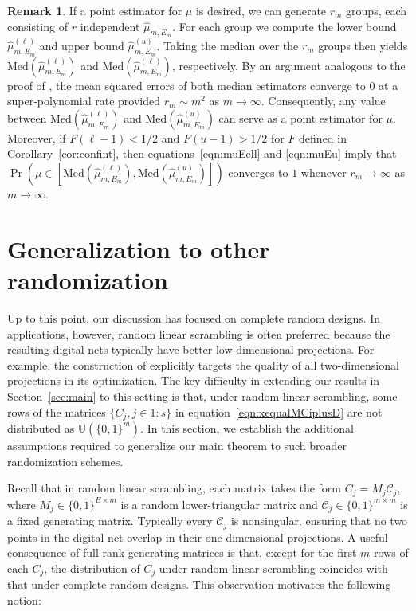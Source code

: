 \documentclass{article}
\theoremstyle{definition}
\newtheorem{remark}{Remark}
\newcommand{\dunif}{\mathbb{U}}
\begin{document}
    \begin{remark}
        If a point estimator for $\mu$ is desired, we can generate $r_m$ groups, each consisting of $r$ independent $\hat{\mu}_{m,E_m}$. For each group we compute the lower bound $\hat{\mu}^{(\ell)}_{m,E_m}$ and upper bound $\hat{\mu}^{(u)}_{m,E_m}$. Taking the median over the $r_m$ groups then yields $\mathrm{Med}(\hat{\mu}^{(\ell)}_{m,E_m})$ and $\mathrm{Med}(\hat{\mu}^{(\ell)}_{m,E_m})$, respectively. By an argument analogous to the proof of \cite[Corollary 3]{superpolymulti}, the mean squared errors of both median estimators converge to $0$ at a super‑polynomial rate provided $r_m\sim m^2$ as $m\to\infty$. Consequently, any value between  $\mathrm{Med}(\hat{\mu}^{(\ell)}_{m,E_m})$ and  $\mathrm{Med}(\hat{\mu}^{(u)}_{m,E_m})$ can serve as a point estimator for $\mu$.  Moreover, if $F(\ell-1)<1/2$ and $F(u-1)>1/2$ for $F$ defined in Corollary~\ref{cor:confint},  then equations~\eqref{eqn:muEell} and \eqref{eqn:muEu} imply that $\Pr(\mu\in [\mathrm{Med}(\hat{\mu}^{(\ell)}_{m,E_m}),\mathrm{Med}(\hat{\mu}^{(u)}_{m,E_m})] )$ converges to $1$ whenever $r_m\to\infty$ as $m\to\infty$.       
    \end{remark}

\section{Generalization to other randomization}\label{sec:general}

Up to this point, our discussion has focused on complete random designs. In applications, however, random linear scrambling is often preferred because the resulting digital nets typically have better low-dimensional projections. For example, the construction of \cite{joe:kuo:2008} explicitly targets the quality of all two-dimensional projections in its optimization. The key difficulty in extending our results in Section~\ref{sec:main} to this setting is that, under random linear scrambling, some rows of the matrices $\{C_j, j\in 1{:}s\}$ in equation~\eqref{eqn:xequalMCiplusD} are not distributed as $\dunif(\{0,1\}^m)$. In this section, we establish the additional assumptions required to generalize our main theorem to such broader randomization schemes.

Recall that in random linear scrambling, each matrix takes the form $C_j=M_j\mathcal{C}_j$, where $M_j\in \{0,1\}^{E\times m}$  is a  random lower-triangular matrix and $\mathcal{C}_j \in \{0,1\}^{m\times m}$ is a fixed generating  matrix. Typically every $\mathcal{C}_j$ is nonsingular, ensuring that no two points in the digital net overlap in their one-dimensional projections. A useful consequence of  full-rank generating matrices is that, except for the first $m$ rows of each $C_j$, the distribution of $C_j$ under random linear scrambling coincides with that under complete random designs. This observation motivates the following notion:
\end{document}
